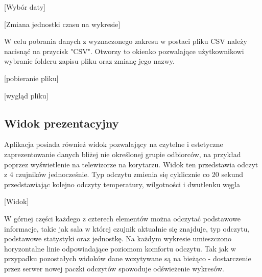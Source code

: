[Wybór daty]

[Zmiana jednostki czasu na wykresie]

W celu pobrania danych z wyznaczonego zakresu w postaci pliku CSV należy nacisnąć na przycisk "CSV". Otworzy to okienko pozwalające użytkownikowi wybranie folderu
zapisu pliku oraz zmianę jego nazwy. 

[pobieranie pliku]

[wygląd pliku]

\subsection{Widok prezentacyjny}
Aplikacja posiada również widok pozwalający na czytelne i estetyczne zaprezentowanie danych bliżej nie określonej grupie odbiorców, na przykład poprzez wyświetlenie
na telewizorze na korytarzu.
Widok ten przedstawia odczyt z 4 czujników jednocześnie. Typ odczytu zmienia się cyklicznie co 20 sekund przedstawiając kolejno odczyty temperatury, wilgotności
i dwutlenku węgla

[Widok]

W górnej części każdego z czterech elementów można odczytać podstawowe informacje, takie jak sala w której czujnik aktualnie się znajduje, typ odczytu, podstawowe
statystyki oraz jednostkę. Na każdym wykresie umieszczono horyzontalne linie odpowiadające poziomom komfortu odczytu. Tak jak w przypadku pozostałych widoków
dane wczytywane są na bieżąco - dostarczenie przez serwer nowej paczki odczytów spowoduje odświeżenie wykresów.